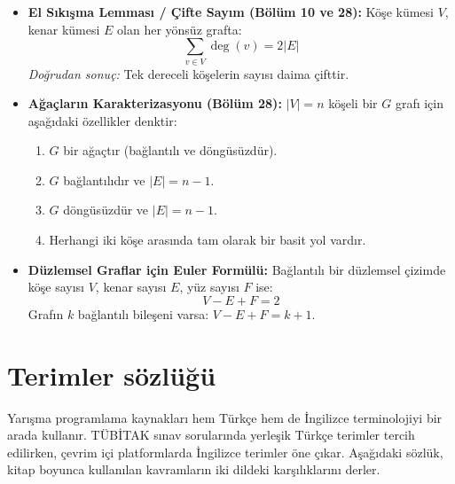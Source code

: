 \begin{itemize}
\item \textbf{El Sıkışma Lemması / Çifte Sayım (Bölüm 10 ve 28):}
Köşe kümesi $V$, kenar kümesi $E$ olan her yönsüz grafta:
    \[
    \sum_{v \in V} \deg(v) = 2|E|
    \]
    \textit{Doğrudan sonuç:} Tek dereceli köşelerin sayısı daima çifttir.

    \item \textbf{Ağaçların Karakterizasyonu (Bölüm 28):}
    $|V| = n$ köşeli bir $G$ grafı için aşağıdaki özellikler denktir:
    \begin{enumerate}
        \item $G$ bir ağaçtır (bağlantılı ve döngüsüzdür).
        \item $G$ bağlantılıdır ve $|E| = n - 1$.
        \item $G$ döngüsüzdür ve $|E| = n - 1$.
        \item Herhangi iki köşe arasında tam olarak bir basit yol vardır.
    \end{enumerate}

    \item \textbf{Düzlemsel Graflar için Euler Formülü:}
    Bağlantılı bir düzlemsel çizimde köşe sayısı $V$, kenar sayısı $E$, yüz sayısı $F$ ise:
    \[
    V - E + F = 2
    \]
    Grafın $k$ bağlantılı bileşeni varsa: $V - E + F = k + 1$.
\end{itemize}

\section{Terimler sözlüğü}

Yarışma programlama kaynakları hem Türkçe hem de İngilizce terminolojiyi bir arada kullanır. TÜBİTAK sınav sorularında yerleşik Türkçe terimler tercih edilirken, çevrim içi platformlarda İngilizce terimler öne çıkar. Aşağıdaki sözlük, kitap boyunca kullanılan kavramların iki dildeki karşılıklarını derler.

